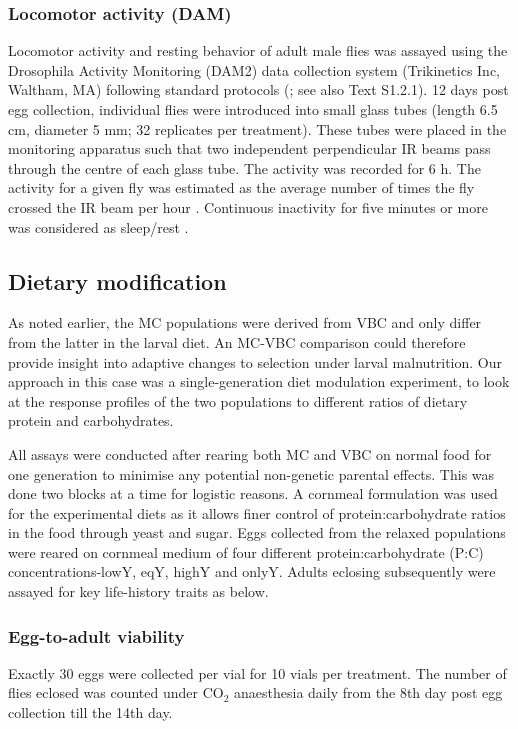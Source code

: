 \documentclass[12pt,onecolumn,twoside]{article}
\begin{document}
	\subsubsection{{Locomotor activity (DAM)}}
	Locomotor activity and resting behavior of adult male flies was assayed using the Drosophila Activity Monitoring (DAM2) data collection system (Trikinetics Inc, Waltham, MA) following standard protocols (\cite{Chiu2010}; see also Text S1.2.1). 12 days post egg collection, individual flies were introduced into small glass tubes (length 6.5 cm, diameter 5 mm; 32 replicates per treatment). These tubes were placed in the monitoring apparatus such that two independent perpendicular IR beams pass through the centre of each glass tube. The activity was recorded for 6 h. The activity for a given fly was estimated as the average number of times the fly crossed the IR beam per hour \citep{Chadov2015}. Continuous inactivity for five minutes or more was considered as sleep/rest \citep{Hendricks2000, Chiu2010}.

	\subsection{Dietary modification}
	As noted earlier, the MC populations were derived from VBC and only differ from the latter in the larval diet. An MC-VBC comparison could therefore provide insight into adaptive changes to selection under larval malnutrition. Our approach in this case was a single-generation diet modulation experiment, to look at the response profiles of the two populations to different ratios of dietary protein and carbohydrates.

	All assays were conducted after rearing both MC and VBC on normal food for one generation to minimise any potential non-genetic parental effects. This was done two blocks at a time for logistic reasons. A cornmeal formulation was used for the experimental diets as it allows finer control of protein:carbohydrate ratios in the food through yeast and sugar. Eggs collected from the relaxed populations were reared on cornmeal medium of four different protein:carbohydrate (P:C) concentrations-lowY, eqY, highY and onlyY. Adults eclosing subsequently were assayed for key life-history traits as below.
	\subsubsection{Egg-to-adult viability}
	Exactly 30 eggs were collected per vial for 10 vials per treatment. The number of flies eclosed was counted under $\text{CO}_{2}$ anaesthesia daily from the 8th day post egg collection till the 14th day.
\end{document}
